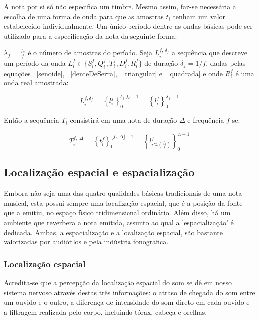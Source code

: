 A nota por si só não especifica um timbre. Mesmo assim, faz-se necessária a escolha de uma forma de onda para que as amostras $t_i$ tenham um valor estabelecido individualmente. Um único período dentre as ondas básicas pode ser utilizado para a especificação da nota da seguinte forma:

$\lambda_f=\frac{f_a}{f}$ é o número de amostras do período. Seja $L_i^{f,\, \delta_f} $
a sequência que descreve um período da onda $L_i^f \in \{S_i^f,Q_i^f,T_i^f,D_i^f,R_i^f \}$ de duração 
$\delta_f=1/f$, dadas pelas equações ~\ref{senoide}, ~\ref{denteDeSerra}, ~\ref{triangular} e ~\ref{quadrada} e onde $R_i^f$ é
uma onda real amostrada:

\begin{equation}\label{periodoUnico}
L_i^{f , \delta_f } = \left\{ l_i^f \right\}_0^{\delta_f . f_a -1}=\left\{ l_i^f \right\}_0^{\lambda_f-1}
\end{equation}

Então a sequência $T_i$ consistirá em uma nota de duração $\Delta$ e frequência $f$ se:

\begin{equation}\label{eq:notaBasicaTimbre}
T_i^{f,\; \Delta}=\left\{t_i^f\right\}_0^{\lfloor f_a . \Delta \rfloor -1}=\left \{ l^f_{i\,\%\left(\frac{f_a}{f}\right)} \right \}_0^{\Lambda-1}
\end{equation}

\subsection{Localização espacial e espacialização}\label{subsec:spac}
Embora não seja uma das quatro qualidades básicas tradicionais de uma nota musical, esta possui sempre uma localização espacial, que é a posição da fonte que a emitiu, no espaço físico tridimensional ordinário. Além disso, há um ambiente que reverbera a nota emitida, assunto ao qual a 'espacialização' é dedicada. Ambas, a espacialização e a localização espacial, são bastante valorizadas
 por audiófilos e pela indústria fonográfica.\cite{floEsp}

 \subsubsection{Localização espacial}
Acredita-se que a percepção da localização espacial do som se dê em nosso sistema nervoso através destas
três informações: o atraso de chegada do som entre um ouvido e o outro, a diferença de intensidade do som direto em cada ouvido e a 
filtragem realizada pelo corpo, incluindo tórax, cabeça e orelhas.\cite{Roederer, hrtf, Heeger}


